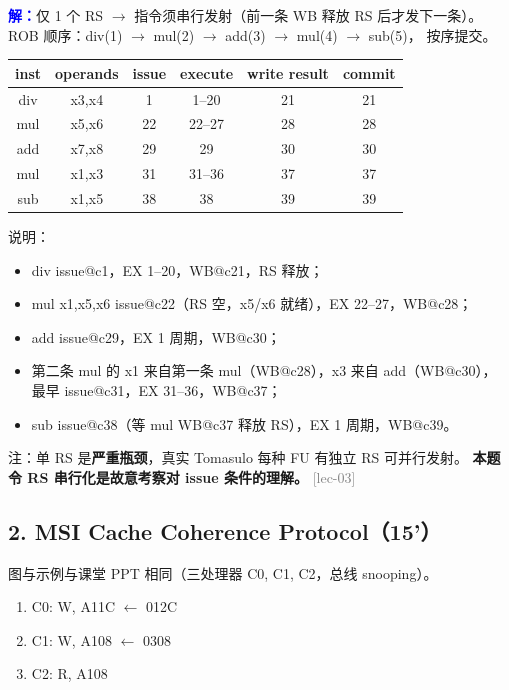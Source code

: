 \documentclass[11pt,a4paper]{article}
\newcommand{\lec}[1]{\textcolor{gray}{[lec-#1]}}
\newcommand{\ans}{\par\noindent\textcolor{blue}{\textbf{解：}}}
\begin{document}
\ans 仅 1 个 RS $\to$ 指令须串行发射（前一条 WB 释放 RS 后才发下一条）。
ROB 顺序：div(1) $\to$ mul(2) $\to$ add(3) $\to$ mul(4) $\to$ sub(5)，
按序提交。

\vspace{4pt}
\begin{tabular}{c|c|c|c|c|c}
inst & operands & issue & execute & write result & commit \\
\midrule
div  & x3,x4 & 1  & 1--20 & 21 & 21 \\
mul  & x5,x6 & 22 & 22--27 & 28 & 28 \\
add  & x7,x8 & 29 & 29 & 30 & 30 \\
mul  & x1,x3 & 31 & 31--36 & 37 & 37 \\
sub  & x1,x5 & 38 & 38 & 39 & 39 \\
\end{tabular}

\vspace{4pt}
\noindent 说明：
\begin{itemize}[nosep]
  \item div issue@c1，EX 1--20，WB@c21，RS 释放；
  \item mul x1,x5,x6 issue@c22（RS 空，x5/x6 就绪），EX 22--27，WB@c28；
  \item add issue@c29，EX 1 周期，WB@c30；
  \item 第二条 mul 的 x1 来自第一条 mul（WB@c28），x3 来自 add（WB@c30），
        最早 issue@c31，EX 31--36，WB@c37；
  \item sub issue@c38（等 mul WB@c37 释放 RS），EX 1 周期，WB@c39。
\end{itemize}

\noindent 注：单 RS 是\textbf{严重瓶颈}，真实 Tomasulo 每种 FU 有独立 RS 可并行发射。
\textbf{本题令 RS 串行化是故意考察对 issue 条件的理解。} \lec{03}

\subsection*{2. MSI Cache Coherence Protocol（15'）}

图与示例与课堂 PPT 相同（三处理器 C0, C1, C2，总线 snooping）。

\begin{enumerate}[label=(\arabic*),leftmargin=*]
  \item C0: W, A11C $\leftarrow$ 012C
  \item C1: W, A108 $\leftarrow$ 0308
  \item C2: R, A108
\end{enumerate}
\end{document}
